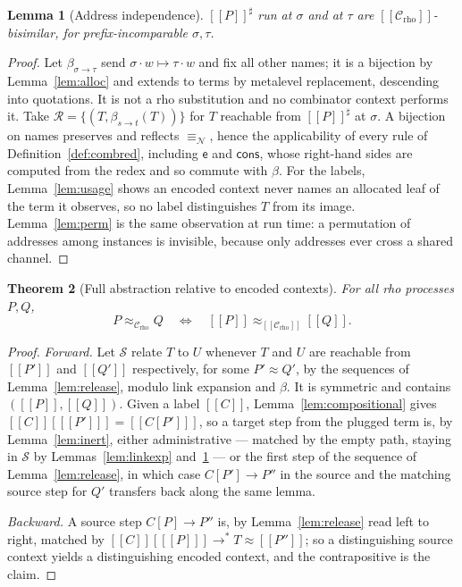 \documentclass[11pt]{article}
\theoremstyle{plain}
\newtheorem{theorem}{Theorem}[section]
\newtheorem{lemma}[theorem]{Lemma}
\theoremstyle{definition}
\theoremstyle{remark}
\newcommand{\enc}[1]{[\![#1]\!]}
\newcommand{\nequiv}{\equiv_{\mathcal{N}}}
\newcommand{\Ctx}{\mathscr{C}}
\newcommand{\bisim}{\approx}
\newcommand{\ev}{\mathsf{e}}
\newcommand{\cons}{\mathsf{cons}}
\newcommand{\red}{\longrightarrow}
\newcommand{\wred}{\longrightarrow^{*}}
\begin{document}
\begin{lemma}[Address independence]
\label{lem:seedind}
$\enc{P}^{\sharp}$ run at $\sigma$ and at $\tau$ are
$\enc{\Ctx_{\mathrm{rho}}}$-bisimilar, for prefix-incomparable $\sigma,\tau$.
\end{lemma}

\begin{proof}
Let $\beta_{\sigma \to \tau}$ send $\sigma\!\cdot\!w \mapsto \tau\!\cdot\!w$
and fix all other names; it is a bijection by Lemma~\ref{lem:alloc} and
extends to terms by metalevel replacement, descending into quotations. It is not a rho substitution and no
combinator context performs it. Take $\mathcal{R} = \{(T,\beta_{s\to t}(T))\}$
for $T$ reachable from $\enc{P}^{\sharp}$ at $\sigma$. A bijection on names preserves and
reflects $\nequiv$, hence the applicability of every rule of
Definition~\ref{def:combred}, including $\ev$ and $\cons$, whose right-hand
sides are computed from the redex and so commute with $\beta$. For the
labels, Lemma~\ref{lem:usage} shows an encoded context never names an allocated leaf
of the term it observes, so no label distinguishes $T$ from its image.
Lemma~\ref{lem:perm} is the same observation at run time: a permutation
of addresses among instances is invisible, because only addresses ever cross
a shared channel.
\end{proof}

\begin{theorem}[Full abstraction relative to encoded contexts]
\label{thm:fullabs}
For all rho processes $P,Q$,
\[
  P \bisim_{\Ctx_{\mathrm{rho}}} Q
  \quad\Longleftrightarrow\quad
  \enc{P} \bisim_{\enc{\Ctx_{\mathrm{rho}}}} \enc{Q}.
\]
\end{theorem}

\begin{proof}
\emph{Forward.} Let $\mathcal{S}$ relate $T$ to $U$ whenever $T$ and $U$ are
reachable from $\enc{P'}$ and $\enc{Q'}$ respectively, for some
$P' \bisim Q'$, by the sequences of Lemma~\ref{lem:release}, modulo link
expansion and $\beta$. It is symmetric and contains
$(\enc{P},\enc{Q})$. Given a label $\enc{C}$, Lemma~\ref{lem:compositional}
gives $\enc{C}[\enc{P'}] = \enc{C[P']}$, so a target step from the plugged
term is, by Lemma~\ref{lem:inert}, either administrative --- matched by the
empty path, staying in $\mathcal{S}$ by
Lemmas~\ref{lem:linkexp} and~\ref{lem:seedind} --- or the first step of the
sequence of Lemma~\ref{lem:release}, in which case $C[P'] \red P''$ in the
source and the matching source step for $Q'$ transfers back along the same
lemma.

\emph{Backward.} A source step $C[P] \red P''$ is, by
Lemma~\ref{lem:release} read left to right, matched by
$\enc{C}[\enc{P}] \wred T \bisim \enc{P''}$; so a distinguishing source
context yields a distinguishing encoded context, and the contrapositive is
the claim.
\end{proof}
\end{document}

